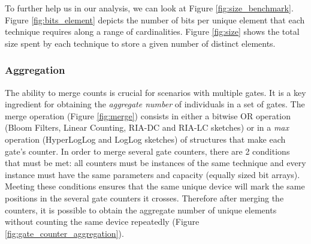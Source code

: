 To further help us in our analysis, we can look at Figure
\ref{fig:size_benchmark}. Figure \ref{fig:bits_element} depicts the
number of bits per unique element that each technique requires along a
range of cardinalities. Figure \ref{fig:size} shows the total size
spent by each technique to store a given number of distinct elements.

\subsubsection{Aggregation}
\label{sec:mergeAbility}

The ability to merge counts is crucial for scenarios with multiple
gates. It is a key ingredient for obtaining the \emph{aggregate
 number} of individuals in a set of gates. The merge operation
(Figure \ref{fig:merge}) consists in either a bitwise OR operation
(Bloom Filters, Linear Counting, RIA-DC and RIA-LC sketches) or in a
\emph{max} operation (HyperLogLog and LogLog sketches) of structures
that make each gate's counter. In order to merge several gate
counters, there are 2 conditions that must be met: all counters must
be instances of the same technique and every instance must have the
same parameters and capacity (equally sized bit arrays). Meeting these
conditions ensures that the same unique device will mark the same
positions in the several gate counters it crosses. Therefore after
merging the counters, it is possible to obtain the aggregate number of
unique elements without counting the same device repeatedly (Figure
\ref{fig:gate_counter_aggregation}).

